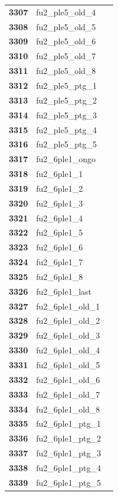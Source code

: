 \documentclass[
  letterpaper,
  DIV=11,
  numbers=noendperiod]{scrartcl}
\begin{document}
\begin{longtable}[t]{>{}cll}
\textbf{3307} & fu2\_ple5\_old\_4 & \\
\textbf{3308} & fu2\_ple5\_old\_5 & \\
\textbf{3309} & fu2\_ple5\_old\_6 & \\
\textbf{3310} & fu2\_ple5\_old\_7 & \\
\addlinespace
\textbf{3311} & fu2\_ple5\_old\_8 & \\
\textbf{3312} & fu2\_ple5\_ptg\_1 & \\
\textbf{3313} & fu2\_ple5\_ptg\_2 & \\
\textbf{3314} & fu2\_ple5\_ptg\_3 & \\
\textbf{3315} & fu2\_ple5\_ptg\_4 & \\
\addlinespace
\textbf{3316} & fu2\_ple5\_ptg\_5 & \\
\textbf{3317} & fu2\_6ple1\_ongo & \\
\textbf{3318} & fu2\_6ple1\_1 & \\
\textbf{3319} & fu2\_6ple1\_2 & \\
\textbf{3320} & fu2\_6ple1\_3 & \\
\addlinespace
\textbf{3321} & fu2\_6ple1\_4 & \\
\textbf{3322} & fu2\_6ple1\_5 & \\
\textbf{3323} & fu2\_6ple1\_6 & \\
\textbf{3324} & fu2\_6ple1\_7 & \\
\textbf{3325} & fu2\_6ple1\_8 & \\
\addlinespace
\textbf{3326} & fu2\_6ple1\_last & \\
\textbf{3327} & fu2\_6ple1\_old\_1 & \\
\textbf{3328} & fu2\_6ple1\_old\_2 & \\
\textbf{3329} & fu2\_6ple1\_old\_3 & \\
\textbf{3330} & fu2\_6ple1\_old\_4 & \\
\addlinespace
\textbf{3331} & fu2\_6ple1\_old\_5 & \\
\textbf{3332} & fu2\_6ple1\_old\_6 & \\
\textbf{3333} & fu2\_6ple1\_old\_7 & \\
\textbf{3334} & fu2\_6ple1\_old\_8 & \\
\textbf{3335} & fu2\_6ple1\_ptg\_1 & \\
\addlinespace
\textbf{3336} & fu2\_6ple1\_ptg\_2 & \\
\textbf{3337} & fu2\_6ple1\_ptg\_3 & \\
\textbf{3338} & fu2\_6ple1\_ptg\_4 & \\
\textbf{3339} & fu2\_6ple1\_ptg\_5 & \\

\end{longtable}
\end{document}
